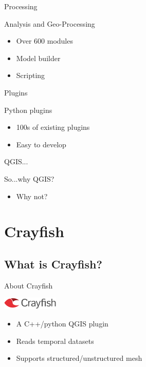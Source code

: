 \begin{frame}{Processing}
	\begin{block}{Analysis and Geo-Processing}
		\begin{itemize}
			\item Over 600 modules
			\item Model builder
			\item Scripting
		\end{itemize}
	\end{block}
\end{frame}

\begin{frame}{Plugins}
	\begin{block}{Python plugins}
		\begin{itemize}
			\item 100s of existing plugins
			\item Easy to develop
		\end{itemize}
	\end{block}
\end{frame}

\begin{frame}{QGIS...}
	\begin{block}{So...why QGIS?}
		\begin{itemize}
			\item Why not?
		\end{itemize}
	\end{block}
\end{frame}

\section{Crayfish}
\subsection{What is Crayfish?}
\begin{frame}{About Crayfish}
	\begin{block}{ {\includegraphics[width=0.2\textwidth]{crayfishlogo.png}}	}
		\begin{itemize}
			\item A C++/python QGIS plugin
			\item Reads temporal datasets
			\item Supports structured/unstructured mesh
		\end{itemize}
	\end{block}

\end{frame}

